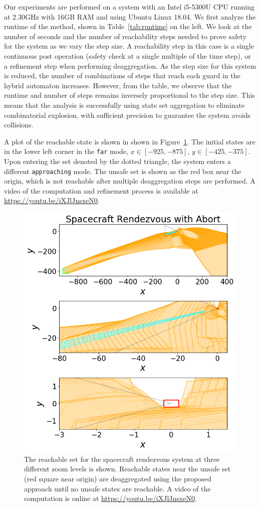 Our experiments are performed on a system with an Intel i5-5300U CPU running at 2.30GHz with 16GB RAM and using Ubuntu Linux 18.04.
%
We first analyze the runtime of the method, shown in Table~\ref{tab:runtime} on the left.
%
We look at the number of seconds and the number of reachability steps needed to prove safety for the system as we vary the step size.
%
A reachability step in this case is a single continuous post operation (safety check at a single multiple of the time step), or a refinement step when performing deaggregation.
%
As the step size for this system is reduced, the number of combinations of steps that reach each guard in the hybrid automaton increases.
%
However, from the table, we observe that the runtime and number of steps remains inversely proportional to the step size.
%
This means that the analysis is successfully using state set aggregation to eliminate combinatorial explosion, with sufficient
precision to guarantee the system avoids collisions.

A plot of the reachable state is shown in shown in Figure~\ref{fig:rendezvous}.
%
The initial states are in the lower left corner in the \texttt{far} mode,
$x \in [-925, -875]$, $y \in [-425, -375]$.
%
Upon entering the set denoted by the dotted triangle,
the system enters a different \texttt{approaching} mode.
%
The unsafe set is shown as the red box near the origin, which is not reachable after multiple deaggregation steps are performed.
%
A video of the computation and refinement process is available at \url{https://youtu.be/iXJlJnsxeN0}.

\begin{figure}[t]
\centerline{\includegraphics[width=0.8\columnwidth]{images/rendezvous.png}}
\caption{The reachable set for the spacecraft rendezvous system at three different zoom levels is shown.
  Reachable states near the unsafe set (red square near origin) are deaggregated using the proposed approach until no unsafe states are reachable.
A video of the computation is online at \url{https://youtu.be/iXJlJnsxeN0}.}
\label{fig:rendezvous}
\end{figure}

